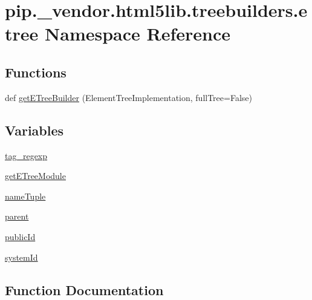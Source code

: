 \hypertarget{namespacepip_1_1__vendor_1_1html5lib_1_1treebuilders_1_1etree}{}\section{pip.\+\_\+vendor.\+html5lib.\+treebuilders.\+etree Namespace Reference}
\label{namespacepip_1_1__vendor_1_1html5lib_1_1treebuilders_1_1etree}
\subsection*{Functions}
\begin{DoxyCompactItemize}
\item 
def \hyperlink{namespacepip_1_1__vendor_1_1html5lib_1_1treebuilders_1_1etree_a9af23af9515289db8257d61b4d262c99}{get\+E\+Tree\+Builder} (Element\+Tree\+Implementation, full\+Tree=False)
\end{DoxyCompactItemize}
\subsection*{Variables}
\begin{DoxyCompactItemize}
\item 
\hyperlink{namespacepip_1_1__vendor_1_1html5lib_1_1treebuilders_1_1etree_a2f6147219946068b6d8e6c00faa87147}{tag\+\_\+regexp}
\item 
\hyperlink{namespacepip_1_1__vendor_1_1html5lib_1_1treebuilders_1_1etree_a97c0da02cdc32b8e2cd3629f6f1f08e8}{get\+E\+Tree\+Module}
\item 
\hyperlink{namespacepip_1_1__vendor_1_1html5lib_1_1treebuilders_1_1etree_a5246f799a10531a7fd823f071214fa20}{name\+Tuple}
\item 
\hyperlink{namespacepip_1_1__vendor_1_1html5lib_1_1treebuilders_1_1etree_af21e8bb5adf2dd0b94e27b010295bcce}{parent}
\item 
\hyperlink{namespacepip_1_1__vendor_1_1html5lib_1_1treebuilders_1_1etree_adc05aa250f8cb4910be62e9d2fa7bb3b}{public\+Id}
\item 
\hyperlink{namespacepip_1_1__vendor_1_1html5lib_1_1treebuilders_1_1etree_a4ffb13189d1469d1226e2b972a41b487}{system\+Id}
\end{DoxyCompactItemize}


\subsection{Function Documentation}
\mbox{\label{namespacepip_1_1__vendor_1_1html5lib_1_1treebuilders_1_1etree_a9af23af9515289db8257d61b4d262c99}} 
